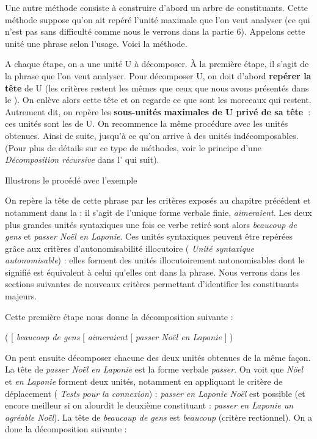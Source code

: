 Une autre méthode consiste à construire d’abord un arbre de constituants. Cette méthode suppose qu’on ait repéré l’unité maximale que l’on veut analyser (ce qui n'est pas sans difficulté comme nous le verrons dans la partie 6). Appelons cette unité une phrase selon l’usage. Voici la méthode.

A chaque étape, on a une unité U à décomposer. À la première étape, il s’agit de la phrase que l’on veut analyser. Pour décomposer U, on doit d’abord \textbf{repérer la tête} de U (les critères restent les mêmes que ceux que nous avons présentés dans le ). On enlève alors cette tête et on regarde ce que sont les morceaux qui restent. Autrement dit, on repère les \textbf{sous-unités} \textbf{maximales de U privé de sa tête~}: ces unités sont les  de U. On recommence la même procédure avec les unités obtenues. Ainsi de suite, jusqu’à ce qu’on arrive à des unités indécomposables. (Pour plus de détails sur ce type de méthodes, voir le principe d’une \textit{Décomposition récursive} dans l’ qui suit).

Illustrons le procédé avec l’exemple 

On repère la tête de cette phrase par les critères exposés au chapitre précédent et notamment dans la  : il s’agit de l’unique forme verbale finie, \textit{aimeraient}. Les deux plus grandes unités syntaxiques une fois ce verbe retiré sont alors \textit{beaucoup de gens} et \textit{passer Noël en Laponie}. Ces unités syntaxiques peuvent être repérées grâce aux critères d’autonomisabilité illocutoire ( \textit{Unité syntaxique autonomisable}) : elles forment des unités illocutoirement autonomisables dont le signifié est équivalent à celui qu’elles ont dans la phrase. Nous verrons dans les sections suivantes de nouveaux critères permettant d’identifier les constituants majeurs.

Cette première étape nous donne la décomposition suivante :

\ea
   ( [ \textit{beaucoup de gens} [ \textit{aimeraient} [ \textit{passer Noël en Laponie} ] )
\z

On peut ensuite décomposer chacune des deux unités obtenues de la même façon. La tête de \textit{passer Noël en Laponie} est la forme verbale \textit{passer}. On voit que \textit{Nöel} et \textit{en Laponie} forment deux unités, notamment en appliquant le critère de déplacement ( \textit{Tests pour la connexion}) : \textit{passer en Laponie Noël} est possible (et encore meilleur si on alourdit le deuxième constituant : \textit{passer en Laponie un agréable Noël}). La tête de \textit{beaucoup de gens} est \textit{beaucoup} (critère rectionnel). On a donc la décomposition suivante :

